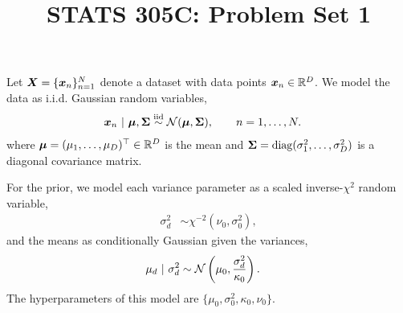 \documentclass[11pt]{article}
\title{STATS 305C: Problem Set 1}
\begin{document}
\maketitle

\noindent
Let $\boldsymbol{X}=\{\boldsymbol{x}_{n}\}_{n=1}^{N}$ denote a dataset with data points $\boldsymbol{x}_{n} \in \mathbb{R}^D$. 
We model the data as i.i.d. Gaussian random variables,
\begin{align*}
    \boldsymbol{x}_{n} ~\vert~ \boldsymbol{\mu}, \boldsymbol{\Sigma} &\stackrel{\text{iid}}{\sim} \mathcal{N}(\boldsymbol{\mu}, \boldsymbol{\Sigma}), \qquad n=1,\dots,N.
\end{align*}
where $\boldsymbol{\mu} = (\mu_1,\dots,\mu_D)^\top \in \mathbb{R}^D$ is the mean and $\boldsymbol{\Sigma} = \mathrm{diag}(\sigma_{1}^2,\dots,\sigma_{D}^2)$ is a diagonal covariance matrix.

For the prior, we model each variance parameter as a scaled inverse-$\chi^2$ random variable,
\begin{align*}
    \sigma_{d}^2 &\sim \chi^{-2}(\nu_0, \sigma_0^2),
\end{align*}
and the means as conditionally Gaussian given the variances,
\begin{align*}
    \mu_{d} ~\vert~ \sigma_{d}^2 &\sim \mathcal{N}\left(\mu_0, \frac{\sigma_{d}^2}{\kappa_{0}}\right).
\end{align*}
The hyperparameters of this model are $\{\mu_{0}, \sigma_{0}^2, \kappa_{0}, \nu_{0}\}$.
\end{document}
